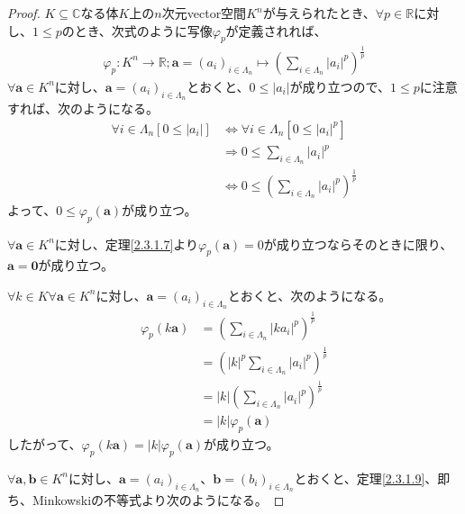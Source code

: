 \documentclass[dvipdfmx]{jsarticle}
\begin{document}
\begin{proof}
$K \subseteq \mathbb{C}$なる体$K$上の$n$次元vector空間$K^{n}$が与えられたとき、$\forall p \in \mathbb{R}$に対し、$1 \leq p$のとき、次式のように写像$\varphi_{p}$が定義されれば、
\begin{align*}
\varphi_{p}:K^{n} \rightarrow \mathbb{R};\mathbf{a} = \left( a_{i} \right)_{i \in \varLambda_{n}} \mapsto \left( \sum_{i \in \varLambda_{n}} \left| a_{i} \right|^{p} \right)^{\frac{1}{p}}
\end{align*}
$\forall\mathbf{a} \in K^{n}$に対し、$\mathbf{a} = \left( a_{i} \right)_{i \in \varLambda_{n}}$とおくと、$0 \leq \left| a_{i} \right|$が成り立つので、$1 \leq p$に注意すれば、次のようになる。
\begin{align*}
\forall i \in \varLambda_{n}\left[ 0 \leq \left| a_{i} \right| \right] &\Leftrightarrow \forall i \in \varLambda_{n}\left[ 0 \leq \left| a_{i} \right|^{p} \right]\\
&\Rightarrow 0 \leq \sum_{i \in \varLambda_{n}} \left| a_{i} \right|^{p}\\
&\Leftrightarrow 0 \leq \left( \sum_{i \in \varLambda_{n}} \left| a_{i} \right|^{p} \right)^{\frac{1}{p}}
\end{align*}
よって、$0 \leq \varphi_{p}\left( \mathbf{a} \right)$が成り立つ。\par
$\forall\mathbf{a} \in K^{n}$に対し、定理\ref{2.3.1.7}より$\varphi_{p}\left( \mathbf{a} \right) = 0$が成り立つならそのときに限り、$\mathbf{a} = \mathbf{0}$が成り立つ。\par
$\forall k \in K\forall\mathbf{a} \in K^{n}$に対し、$\mathbf{a} = \left( a_{i} \right)_{i \in \varLambda_{n}}$とおくと、次のようになる。
\begin{align*}
\varphi_{p}\left( k\mathbf{a} \right) &= \left( \sum_{i \in \varLambda_{n}} \left| ka_{i} \right|^{p} \right)^{\frac{1}{p}}\\
&= \left( |k|^{p}\sum_{i \in \varLambda_{n}} \left| a_{i} \right|^{p} \right)^{\frac{1}{p}}\\
&= |k|\left( \sum_{i \in \varLambda_{n}} \left| a_{i} \right|^{p} \right)^{\frac{1}{p}}\\
&= |k|\varphi_{p}\left( \mathbf{a} \right)
\end{align*}
したがって、$\varphi_{p}\left( k\mathbf{a} \right) = |k|\varphi_{p}\left( \mathbf{a} \right)$が成り立つ。\par
$\forall\mathbf{a},\mathbf{b} \in K^{n}$に対し、$\mathbf{a} = \left( a_{i} \right)_{i \in \varLambda_{n}}$、$\mathbf{b} = \left( b_{i} \right)_{i \in \varLambda_{n}}$とおくと、定理\ref{2.3.1.9}、即ち、Minkowskiの不等式より次のようになる。

\end{proof}
\end{document}

